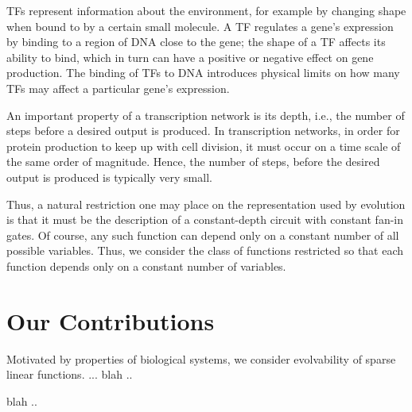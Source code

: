 
TFs represent information about the environment,
for example by changing shape when bound to by a certain small molecule.
A TF regulates a gene's expression by binding to a region of DNA close to the
gene; the shape of a TF affects its ability to bind,
which in turn can have a positive or negative effect on gene production.
The binding of TFs to DNA introduces physical limits on how many TFs may affect
a particular gene's expression.


An important property of a transcription network is its depth, i.e.,
the number of steps before a desired output is produced. In transcription
networks, in order for protein production to keep up with cell division,
it must occur on a time scale of the same order of magnitude. Hence, the
number of steps, before the desired output is produced is typically very small.


Thus, a natural restriction one may place on the representation used by
evolution is that it must be the description of a constant-depth circuit with
constant fan-in gates. Of course, any such function can depend only on a
constant number of all possible variables. Thus, we consider the class of
functions restricted so that each function depends only on a constant number of
variables.


\section{Our Contributions}

Motivated by properties of biological systems, we consider evolvability of
sparse linear functions. ... blah ..

blah ..
